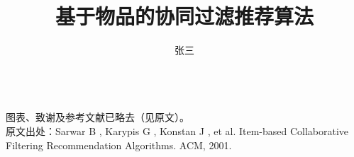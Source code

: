 \documentclass{upctrans}
\begin{document}

\title{基于物品的协同过滤推荐算法}
\author{张三}

\maketitle








~\\
图表、致谢及参考文献已略去（见原文）。
~\\
原文出处：Sarwar B ,  Karypis G ,  Konstan J , et al. Item-based Collaborative Filtering Recommendation Algorithms. ACM, 2001.
\end{document}

